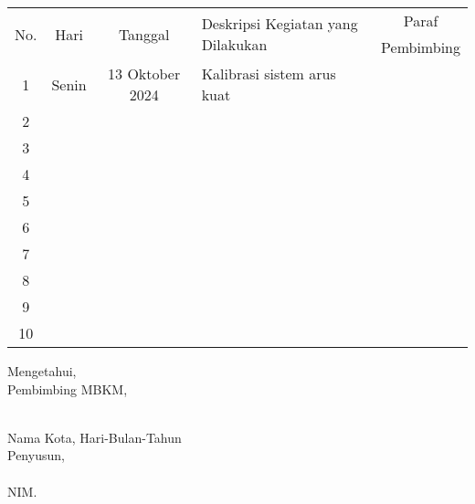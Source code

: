 \begin{table}[h]
    \begin{tabular}{|c|c|c|l|c|}
        \hline
        \multirow{2}{*}{No.} & \multirow{2}{*}{Hari} & \multirow{2}{*}{Tanggal} & \multirow{2}{*}{Deskripsi Kegiatan yang Dilakukan} & Paraf \\
          & & & & Pembimbing \\ \hline 
        1 & Senin & 13 Oktober 2024 & Kalibrasi sistem arus kuat & \\ \hline
        2 & & & & \\ \hline
        3 & & & & \\ \hline
        4 & & & & \\ \hline
        5 & & & & \\ \hline
        6 & & & & \\ \hline
        7 & & & & \\ \hline
        8 & & & & \\ \hline
        9 & & & & \\ \hline
        10 & & & & \\ \hline
    \end{tabular}
\end{table}

\vspace{2cm}


\begin{minipage}{0.45\textwidth}
    Mengetahui,\\
    Pembimbing MBKM,\\[2cm]
    \underline{\pembimbingPerusahaan}\\
    \jabatanPembimbing
\end{minipage}%
\hfill
 \begin{minipage}{0.45\textwidth}
    Nama Kota, Hari-Bulan-Tahun \\
    Penyusun, \\[2cm]
    \underline{\penulis}\\
    NIM. \nim
\end{minipage}